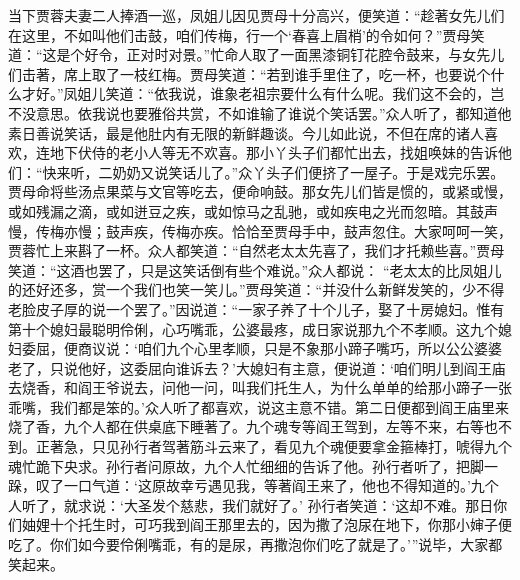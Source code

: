 \begin{parag}
    当下贾蓉夫妻二人捧酒一巡，凤姐儿因见贾母十分高兴，便笑道：“趁著女先儿们在这里，不如叫他们击鼓，咱们传梅，行一个‘春喜上眉梢’的令如何？”贾母笑道：“这是个好令，正对时对景。”忙命人取了一面黑漆铜钉花腔令鼓来，与女先儿们击著，席上取了一枝红梅。贾母笑道：“若到谁手里住了，吃一杯，也要说个什么才好。”凤姐儿笑道：“依我说，谁象老祖宗要什么有什么呢。我们这不会的，岂不没意思。依我说也要雅俗共赏，不如谁输了谁说个笑话罢。”众人听了，都知道他素日善说笑话，最是他肚内有无限的新鲜趣谈。今儿如此说，不但在席的诸人喜欢，连地下伏侍的老小人等无不欢喜。那小丫头子们都忙出去，找姐唤妹的告诉他们：“快来听，二奶奶又说笑话儿了。”众丫头子们便挤了一屋子。于是戏完乐罢。贾母命将些汤点果菜与文官等吃去，便命响鼓。那女先儿们皆是惯的，或紧或慢，或如残漏之滴，或如迸豆之疾，或如惊马之乱驰，或如疾电之光而忽暗。其鼓声慢，传梅亦慢；鼓声疾，传梅亦疾。恰恰至贾母手中，鼓声忽住。大家呵呵一笑，贾蓉忙上来斟了一杯。众人都笑道：“自然老太太先喜了，我们才托赖些喜。”贾母笑道：“这酒也罢了，只是这笑话倒有些个难说。”众人都说： “老太太的比凤姐儿的还好还多，赏一个我们也笑一笑儿。”贾母笑道：“并没什么新鲜发笑的，少不得老脸皮子厚的说一个罢了。”因说道：“一家子养了十个儿子，娶了十房媳妇。惟有第十个媳妇最聪明伶俐，心巧嘴乖，公婆最疼，成日家说那九个不孝顺。这九个媳妇委屈，便商议说：‘咱们九个心里孝顺，只是不象那小蹄子嘴巧，所以公公婆婆老了，只说他好，这委屈向谁诉去？’大媳妇有主意，便说道：‘咱们明儿到阎王庙去烧香，和阎王爷说去，问他一问，叫我们托生人，为什么单单的给那小蹄子一张乖嘴，我们都是笨的。’众人听了都喜欢，说这主意不错。第二日便都到阎王庙里来烧了香，九个人都在供桌底下睡著了。九个魂专等阎王驾到，左等不来，右等也不到。正著急，只见孙行者驾著筋斗云来了，看见九个魂便要拿金箍棒打，唬得九个魂忙跪下央求。孙行者问原故，九个人忙细细的告诉了他。孙行者听了，把脚一跺，叹了一口气道：‘这原故幸亏遇见我，等著阎王来了，他也不得知道的。’九个人听了，就求说：‘大圣发个慈悲，我们就好了。’ 孙行者笑道：‘这却不难。那日你们妯娌十个托生时，可巧我到阎王那里去的，因为撒了泡尿在地下，你那小婶子便吃了。你们如今要伶俐嘴乖，有的是尿，再撒泡你们吃了就是了。’”说毕，大家都笑起来。
\end{parag}



